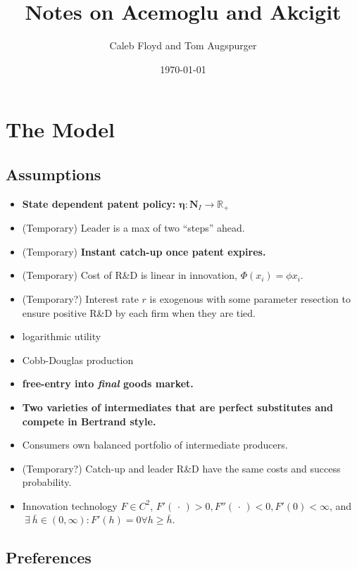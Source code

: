 \documentclass[11pt]{article}
\title{Notes on Acemoglu and Akcigit}
\author{Caleb Floyd and Tom Augspurger}
\date{\today}
\begin{document}
\maketitle

\section{The Model}
\label{sec:the_model}

\subsection{Assumptions}
\label{sub:assumptions}

  \begin{itemize}
    \item \textbf{State dependent patent policy:} $\mathbf{\eta} : \mathbf{N}_I \rightarrow \mathbb{R_+}$
    \item (Temporary) Leader is a max of two ``steps'' ahead.
    \item (Temporary) \textbf{Instant catch-up once patent expires.}
    \item (Temporary) Cost of R\&D is linear in innovation, $\Phi(x_i) = \phi x_i$.
    \item (Temporary?) Interest rate $r$ is exogenous with some parameter resection to ensure positive R\&D by each firm when they are tied.
    \item logarithmic utility
    \item Cobb-Douglas production
    \item \textbf{free-entry into \emph{final} goods market.}
    \item \textbf{Two varieties of intermediates that are perfect substitutes and compete in Bertrand style.}
    \item Consumers own balanced portfolio of intermediate producers.
    \item (Temporary?) Catch-up and leader R\&D have the same costs and success probability.
    \item Innovation technology $F \in C^2$, $F'(\,\cdot\,) > 0, F''(\,\cdot\,) < 0, F'(0) < \infty$, and $\ \exists\ \bar{h} \in (0, \infty) : F'(h) = 0 \forall h \geq \bar{h}$.
  \end{itemize}

\subsection{Preferences}
\label{sub:preferences}
\end{document}
